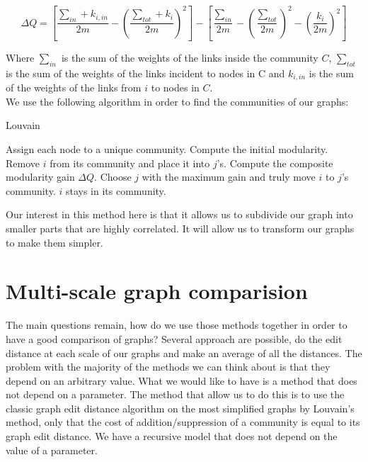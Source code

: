 \documentclass[UTF8, twoside]{EPURapport}
\begin{document}
\[
\Delta Q = \left[ \frac{\sum_{in}+k_{i,in}}{2m} - \left( \frac{\sum_{tot}+k_i}{2m} \right)^2 \right] -  \left[ \frac{\sum_{in}}{2m} - \left( \frac{\sum_{tot}}{2m} \right)^2 - \left( \frac{k_i}{2m} \right)^2 \right]
\]

	Where $\sum_{in}$ is the sum of the weights of the links inside the community $C$, $\sum_{tot}$ is the sum of the weights of the links incident to nodes in C and $k_{i,in}$ is the sum of the weights of the links from $i$ to nodes in $C$.
\\

	We use the following algorithm in order to find the communities of our graphs:


\begin{algorithm}
  \caption{Louvain}
  \begin{algorithmic}[1]
      \State Assign each node to a unique community.
      \State Compute the initial modularity.
      \Repeat
		  	\State Remove $i$ from its community and place it into $j$'s.
		  	\State Compute the composite modularity gain $\Delta Q$.
		  \EndFor
		  	\State Choose $j$ with the maximum gain and truly move $i$ to $j$'s community.
		  \Else
		  	\State $i$ stays in its community.
		  \EndIf
		\EndFor
  \end{algorithmic}
\end{algorithm}

	Our interest in this method here is that it allows us to subdivide our graph into smaller parts that are highly correlated. It will allow us to transform our graphs to make them simpler.

\chapter{Multi-scale graph comparision}

	\hspace{4ex}The main questions remain, how do we use those methods together in order to have a good comparison of graphs? Several approach are possible, do the edit distance at each scale of our graphs and make an average of all the distances. The problem with the majority of the methods we can think about is that they depend on an arbitrary value. What we would like to have is a method that does not depend on a parameter. The method that allow us to do this is to use the classic graph edit distance algorithm on the most simplified graphs by Louvain's method, only that the cost of addition/suppression of a community is equal to its graph edit distance. We have a recursive model that does not depend on the value of a parameter.
	
\end{document}
